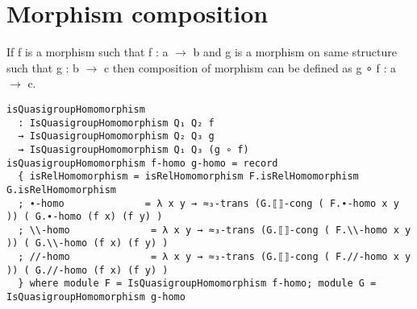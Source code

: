\section{Morphism composition}
If f is a morphism such that f : a \(\rightarrow\) b and g is a morphism on same
structure such that g : b \(\rightarrow\) c then composition of morphism can be
defined as g ∘ f : a \(\rightarrow\) c.
\begin{comment}
module _ \{Q\textsubscript{1} : RawQuasigroup a ℓ\textsubscript{1}\}  \{Q\textsubscript{2} : RawQuasigroup b ℓ\textsubscript{2}\} \{Q\textsubscript{3} : RawQuasigroup c ℓ\textsubscript{3}\}
         (open RawQuasigroup) (≈\textsubscript{3}-trans : Transitive (_≈_ Q\textsubscript{3}))
         \{f : Carrier Q\textsubscript{1} → Carrier Q\textsubscript{2}\} \{g : Carrier Q\textsubscript{2} → Carrier Q\textsubscript{3}\}  where
\end{comment}
\begin{verbatim}
isQuasigroupHomomorphism
  : IsQuasigroupHomomorphism Q₁ Q₂ f
  → IsQuasigroupHomomorphism Q₂ Q₃ g
  → IsQuasigroupHomomorphism Q₁ Q₃ (g ∘ f)
isQuasigroupHomomorphism f-homo g-homo = record
  { isRelHomomorphism = isRelHomomorphism F.isRelHomomorphism G.isRelHomomorphism
  ; ∙-homo              = λ x y → ≈₃-trans (G.⟦⟧-cong ( F.∙-homo x y )) ( G.∙-homo (f x) (f y) )
  ; \\-homo              = λ x y → ≈₃-trans (G.⟦⟧-cong ( F.\\-homo x y )) ( G.\\-homo (f x) (f y) )
  ; //-homo              = λ x y → ≈₃-trans (G.⟦⟧-cong ( F.//-homo x y )) ( G.//-homo (f x) (f y) )
  } where module F = IsQuasigroupHomomorphism f-homo; module G = IsQuasigroupHomomorphism g-homo
\end{verbatim}


